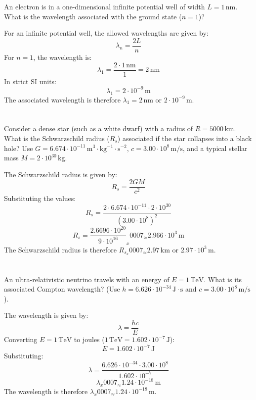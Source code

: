 \documentclass{article}
\begin{document}
\section{}
An electron is in a one-dimensional infinite potential well of width \( L = 1 \, \mathrm{nm} \). What is the wavelength associated with the ground state (\( n = 1 \))?

For an infinite potential well, the allowed wavelengths are given by: \[ \lambda_n = \frac{2L}{n} \] For \( n = 1 \), the wavelength is: \[ \lambda_1 = \frac{2 \cdot 1 \, \mathrm{nm}}{1} = 2 \, \mathrm{nm} \] In strict SI units: \[ \lambda_1 = 2 \cdot 10^{-9} \, \mathrm{m} \] The associated wavelength is therefore \( \lambda_1 = 2 \, \mathrm{nm} \) or \( 2 \cdot 10^{-9} \, \mathrm{m} \).

\section{}
Consider a dense star (such as a white dwarf) with a radius of \( R = 5000 \, \mathrm{km} \). What is the Schwarzschild radius (\( R_s \)) associated if the star collapses into a black hole? Use \( G = 6.674 \cdot 10^{-11} \, \mathrm{m^3 \cdot kg^{-1} \cdot s^{-2}} \), \( c = 3.00 \cdot 10^8 \, \mathrm{m/s} \), and a typical stellar mass \( M = 2 \cdot 10^{30} \, \mathrm{kg} \).

The Schwarzschild radius is given by: \[ R_s = \frac{2 G M}{c^2} \] Substituting the values: \[ R_s = \frac{2 \cdot 6.674 \cdot 10^{-11} \cdot 2 \cdot 10^{30}}{(3.00 \cdot 10^8)^2} \] \[ R_s = \frac{2.6696 \cdot 10^{20}}{9 \cdot 10^{16}} _x0007_\approx 2.966 \cdot 10^3 \, \mathrm{m} \] The Schwarzschild radius is therefore \( R_s _x0007_\approx 2.97 \, \mathrm{km} \) or \( 2.97 \cdot 10^3 \, \mathrm{m} \).

\section{}
An ultra-relativistic neutrino travels with an energy of \( E = 1 \, \mathrm{TeV} \). What is its associated Compton wavelength? (Use \( h = 6.626 \cdot 10^{-34} \, \mathrm{J \cdot s} \) and \( c = 3.00 \cdot 10^8 \, \mathrm{m/s} \)).

The wavelength is given by: \[ \lambda = \frac{h c}{E} \] Converting \( E = 1 \, \mathrm{TeV} \) to joules (\( 1 \, \mathrm{TeV} = 1.602 \cdot 10^{-7} \, \mathrm{J} \)): \[ E = 1.602 \cdot 10^{-7} \, \mathrm{J} \] Substituting: \[ \lambda = \frac{6.626 \cdot 10^{-34} \cdot 3.00 \cdot 10^8}{1.602 \cdot 10^{-7}} \] \[ \lambda _x0007_\approx 1.24 \cdot 10^{-18} \, \mathrm{m} \] The wavelength is therefore \( \lambda _x0007_\approx 1.24 \cdot 10^{-18} \, \mathrm{m} \).
\end{document}
